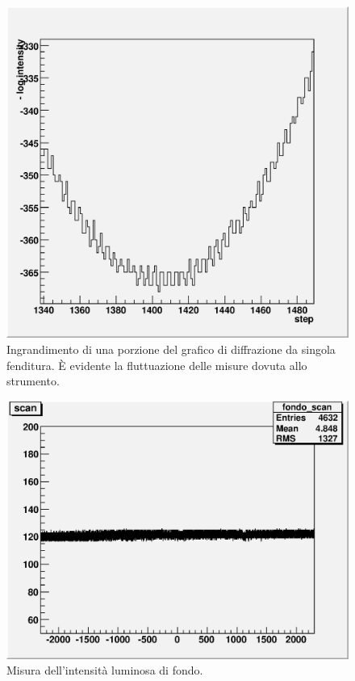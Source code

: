 \documentclass[italian,a4paper]{article}
\begin{document}
\begin{figure}[ph]\centering
\includegraphics[scale=.6]{dentini.eps}
\caption{Ingrandimento di una porzione del grafico di diffrazione da singola
fenditura. \`{E} evidente la fluttuazione delle misure dovuta allo strumento.}\label{dentini}
\end{figure}
\begin{figure}[ph]\centering
\includegraphics[scale=.6]{fondo.hist.eps}
\caption{Misura dell'intensità luminosa di fondo.}\label{fondo}
\end{figure}
\end{document}
